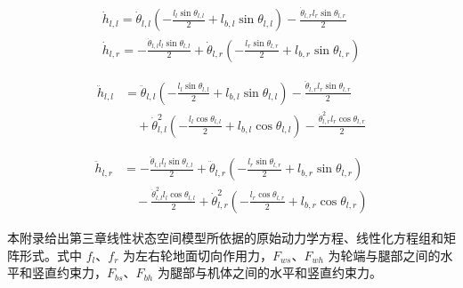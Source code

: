 \begin{gather}
  \dot{h}_{l,l} =
  \dot{\theta}_{l,l}\left(-\frac{l_l\sin\theta_{l,l}}{2}+l_{b,l}\sin\theta_{l,l}\right)
  -\frac{\dot{\theta}_{l,r}l_r\sin\theta_{l,r}}{2} \\
  \dot{h}_{l,r} =
  -\frac{\dot{\theta}_{l,l}l_l\sin\theta_{l,l}}{2}
  +\dot{\theta}_{l,r}\left(-\frac{l_r\sin\theta_{l,r}}{2}+l_{b,r}\sin\theta_{l,r}\right)
\end{gather}

\begin{equation}
\begin{aligned}
  \ddot{h}_{l,l} &=
  \ddot{\theta}_{l,l}\left(-\frac{l_l\sin\theta_{l,l}}{2}+l_{b,l}\sin\theta_{l,l}\right)
  -\frac{\ddot{\theta}_{l,r}l_r\sin\theta_{l,r}}{2} \\
  &\quad
  +\dot{\theta}_{l,l}^2\left(-\frac{l_l\cos\theta_{l,l}}{2}+l_{b,l}\cos\theta_{l,l}\right)
  -\frac{\dot{\theta}_{l,r}^2l_r\cos\theta_{l,r}}{2}
\end{aligned}
\end{equation}

\begin{equation}
\begin{aligned}
  \ddot{h}_{l,r} &=
  -\frac{\ddot{\theta}_{l,l}l_l\sin\theta_{l,l}}{2}
  +\ddot{\theta}_{l,r}\left(-\frac{l_r\sin\theta_{l,r}}{2}+l_{b,r}\sin\theta_{l,r}\right) \\
  &\quad
  -\frac{\dot{\theta}_{l,l}^2l_l\cos\theta_{l,l}}{2}
  +\dot{\theta}_{l,r}^2\left(-\frac{l_r\cos\theta_{l,r}}{2}+l_{b,r}\cos\theta_{l,r}\right)
\end{aligned}
\end{equation}

\label{app:dynamics}

本附录给出第三章线性状态空间模型所依据的原始动力学方程、线性化方程组和矩阵形式。式中 $f_l$、$f_r$ 为左右轮地面切向作用力，$F_{ws}$、$F_{wh}$ 为轮端与腿部之间的水平和竖直约束力，$F_{bs}$、$F_{bh}$ 为腿部与机体之间的水平和竖直约束力。


